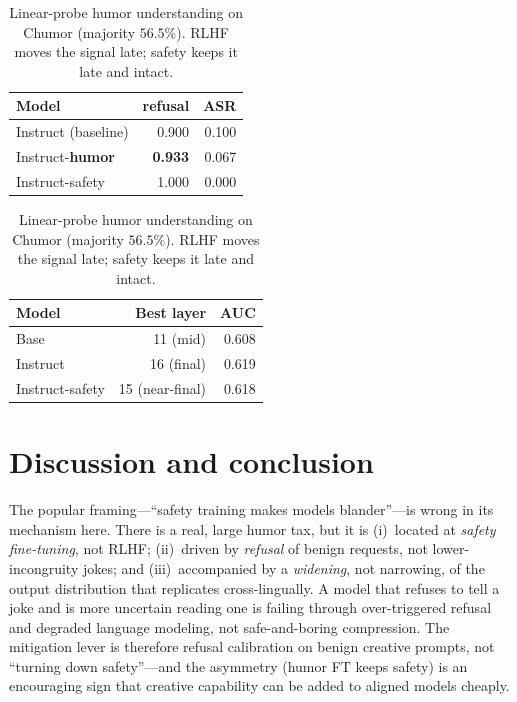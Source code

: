 \documentclass{article}
\begin{document}
\begin{table}[t]
  \begin{minipage}{0.48\linewidth}
    \caption{Reverse direction: refusal on 120 harmful prompts (higher $=$ safer; ASR $=1-$refusal). Humor FT does \emph{not} erode safety.}
    \label{tab:reverse}
    \centering
    \begin{tabular}{lrr}
      \toprule
      Model & refusal & ASR \\
      \midrule
      Instruct (baseline)     & 0.900          & 0.100 \\
      Instruct-\textbf{humor} & \textbf{0.933} & 0.067 \\
      Instruct-safety         & 1.000          & 0.000 \\
      \bottomrule
    \end{tabular}
  \end{minipage}\hfill
  \begin{minipage}{0.48\linewidth}
    \caption{Linear-probe humor understanding on Chumor (majority $56.5\%$). RLHF moves the signal late; safety keeps it late and intact.}
    \label{tab:probe}
    \centering
    \begin{tabular}{lrr}
      \toprule
      Model & Best layer & AUC \\
      \midrule
      Base            & 11 (mid)        & 0.608 \\
      Instruct        & 16 (final)      & 0.619 \\
      Instruct-safety & 15 (near-final) & 0.618 \\
      \bottomrule
    \end{tabular}
  \end{minipage}
\end{table}


\section{Discussion and conclusion}

The popular framing---``safety training makes models blander''---is wrong in its mechanism here. There is a real, large humor tax, but it is (i)~located at \emph{safety fine-tuning}, not RLHF; (ii)~driven by \emph{refusal} of benign requests, not lower-incongruity jokes; and (iii)~accompanied by a \emph{widening}, not narrowing, of the output distribution that replicates cross-lingually. A model that refuses to tell a joke and is more uncertain reading one is failing through over-triggered refusal and degraded language modeling, not safe-and-boring compression. The mitigation lever is therefore refusal calibration on benign creative prompts, not ``turning down safety''---and the asymmetry (humor FT keeps safety) is an encouraging sign that creative capability can be added to aligned models cheaply.
\end{document}
